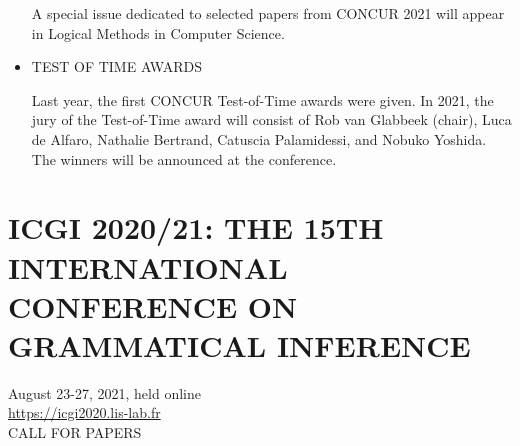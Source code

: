 \documentclass[prodmode,acmtecs]{acmsmall} %
\begin{document}
\begin{itemize}
  A special issue dedicated to selected papers from CONCUR 2021 will appear in Logical Methods in Computer Science. 
 
\item  TEST OF TIME AWARDS 
 
  Last year, the first CONCUR Test-of-Time awards were given. In 2021, the jury of the Test-of-Time award will consist of Rob van Glabbeek (chair), Luca de Alfaro, Nathalie Bertrand, Catuscia Palamidessi, and Nobuko Yoshida. The winners will be announced at the conference. 
 
\end{itemize}\section{ICGI 2020/21: THE 15TH INTERNATIONAL CONFERENCE ON GRAMMATICAL INFERENCE}\label{ICGI202021}  August 23-27, 2021, held online\\ 
  \href{https://icgi2020.lis-lab.fr}{https://icgi2020.lis-lab.fr}\\ 
CALL FOR PAPERS 
\end{document}
